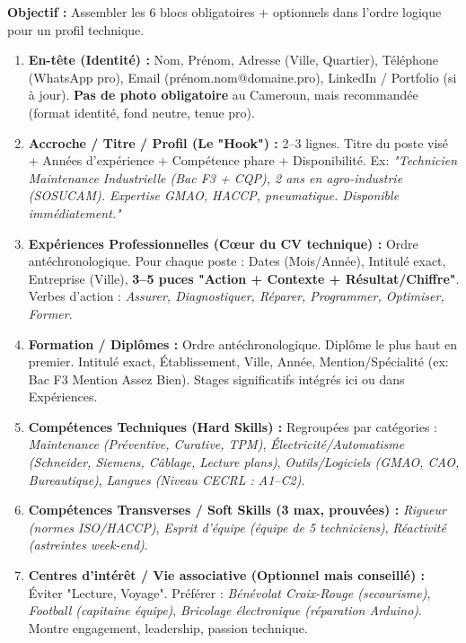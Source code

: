 \documentclass[11pt]{article}
\newcommand{\cle}[1]{{\popxbold\color{popdark}#1}}
\begin{document}
\begin{methode}
\textbf{Objectif :} Assembler les 6 blocs obligatoires + optionnels dans l'ordre logique pour un profil technique.
\begin{enumerate}
    \item \textbf{En-tête (Identité) :} Nom, Prénom, Adresse (Ville, Quartier), Téléphone (WhatsApp pro), Email (prénom.nom@domaine.pro), \cle{LinkedIn / Portfolio} (si à jour). \textbf{Pas de photo obligatoire} au Cameroun, mais recommandée (format identité, fond neutre, tenue pro).
    \item \textbf{Accroche / Titre / Profil (Le "Hook") :} 2--3 lignes. \cle{Titre du poste visé} + \cle{Années d'expérience} + \cle{Compétence phare} + \cle{Disponibilité}. Ex: \emph{"Technicien Maintenance Industrielle (Bac F3 + CQP), 2 ans en agro-industrie (SOSUCAM). Expertise GMAO, HACCP, pneumatique. Disponible immédiatement."}
    \item \textbf{Expériences Professionnelles (Cœur du CV technique) :} Ordre antéchronologique. Pour chaque poste : Dates (Mois/Année), Intitulé exact, Entreprise (Ville), \textbf{3--5 puces "Action + Contexte + Résultat/Chiffre"}. Verbes d'action : \emph{Assurer, Diagnostiquer, Réparer, Programmer, Optimiser, Former}.
    \item \textbf{Formation / Diplômes :} Ordre antéchronologique. Diplôme le plus haut en premier. Intitulé exact, Établissement, Ville, Année, \cle{Mention/Spécialité} (ex: Bac F3 Mention Assez Bien). Stages significatifs intégrés ici ou dans Expériences.
    \item \textbf{Compétences Techniques (Hard Skills) :} Regroupées par catégories : \emph{Maintenance (Préventive, Curative, TPM)}, \emph{Électricité/Automatisme (Schneider, Siemens, Câblage, Lecture plans)}, \emph{Outils/Logiciels (GMAO, CAO, Bureautique)}, \emph{Langues (Niveau CECRL : A1--C2)}.
    \item \textbf{Compétences Transverses / Soft Skills (3 max, prouvées) :} \emph{Rigueur (normes ISO/HACCP)}, \emph{Esprit d'équipe (équipe de 5 techniciens)}, \emph{Réactivité (astreintes week-end)}.
    \item \textbf{Centres d'intérêt / Vie associative (Optionnel mais conseillé) :} Éviter "Lecture, Voyage". Préférer : \emph{Bénévolat Croix-Rouge (secourisme)}, \emph{Football (capitaine équipe)}, \emph{Bricolage électronique (réparation Arduino)}. Montre engagement, leadership, passion technique.
\end{enumerate}
\end{methode}
\end{document}
